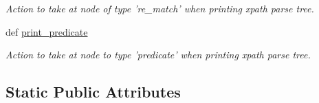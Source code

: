 \begin{DoxyCompactItemize}
\begin{DoxyCompactList}\small\item\em Action to take at node of type 're\-\_\-match' when printing xpath parse tree. \end{DoxyCompactList}\item 
def \hyperlink{classxutools_1_1parsers_1_1_x_path_parser_a7379879d11a15eee0f3b29e034d41a9f}{print\-\_\-predicate}
\begin{DoxyCompactList}\small\item\em Action to take at node to type 'predicate' when printing xpath parse tree. \end{DoxyCompactList}\end{DoxyCompactItemize}
\subsection*{Static Public Attributes}
